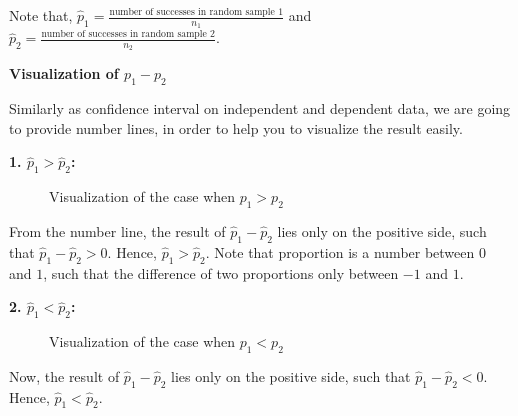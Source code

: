 Note that, $\hat{p}_1 = \frac{\text{number of successes in random sample 1}}{n_1}$ and $\hat{p}_2 = \frac{\text{number of successes in random sample 2}}{n_2}$.

\textbf{Visualization of $p_1 - p_2$}

Similarly as confidence interval on independent and dependent data, we are going to provide number lines, in order to help you to visualize the result easily.

\textbf{1. $\hat{p}_1 > \hat{p}_2$:}

\begin{center}
\begin{figure}[h!]
\centering
{}
\caption{Visualization of the case when $p_1 > p_2$}
\end{figure}
\end{center}

From the number line, the result of $\hat{p}_1 - \hat{p}_2$ lies only on the positive side, such that $\hat{p}_1 - \hat{p}_2 > 0$. Hence, $\hat{p}_1 > \hat{p}_2$. Note that proportion is a number between $0$ and $1$, such that the difference of two proportions only between $-1$ and $1$.

\textbf{2. $\hat{p}_1 < \hat{p}_2$:}

\begin{center}
\begin{figure}[h!]
\centering
{}
\caption{Visualization of the case when $p_1 < p_2$}
\end{figure}
\end{center}

Now, the result of $\hat{p}_1 - \hat{p}_2$ lies only on the positive side, such that $\hat{p}_1 - \hat{p}_2 < 0$. Hence, $\hat{p}_1 < \hat{p}_2$.

